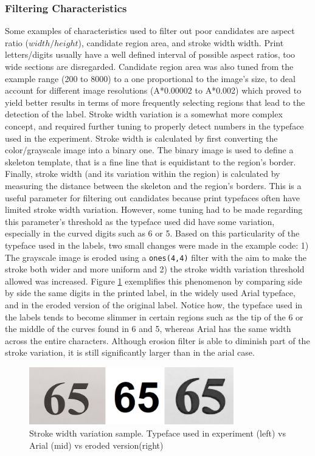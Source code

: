 \documentclass[11pt]{article}
\begin{document}
    \subsubsection{Filtering Characteristics}
        Some examples of characteristics used to filter out poor candidates are aspect ratio ($width / height$), candidate region area, and stroke width width. Print letters/digits usually have a well defined interval of possible aspect ratios, too wide sections are disregarded. Candidate region area was also tuned from the example range (200 to 8000) to a one proportional to the image's size, to deal account for different image resolutions (A*0.00002 to A*0.002) which proved to yield better results in terms of more frequently selecting regions that lead to the detection of the label. Stroke width variation is a somewhat more complex concept, and required further tuning to properly detect numbers in the typeface used in the experiment. Stroke width is calculated by first converting the color/grayscale image into a binary one. The binary image is used to define a skeleton template, that is a fine line that is equidistant to the region's border. Finally, stroke width (and its variation within the region) is calculated by measuring the distance between the skeleton and the region's borders. This is a useful parameter for filtering out candidates because print typefaces often have limited stroke width variation. However, some tuning had to be made regarding this parameter's threshold as the typeface used did have some variation, especially in the curved digits such as 6 or 5. Based on this particularity of the typeface used in the labels, two small changes were made in the example code: 1) The grayscale image is eroded using a \texttt{ones(4,4)} filter with the aim to make the stroke both wider and more uniform and 2) the stroke width variation threshold allowed was increased. Figure \ref{fig:ocr:stroke} exemplifies this phenomenon by comparing side by side the same digits in the printed label, in the widely used Arial typeface, and in the eroded version of the original label. Notice how, the typeface used in the labels tends to become slimmer in certain regions such as the tip of the 6 or the middle of the curves found in 6 and 5, whereas Arial has the same width across the entire characters. Although erosion filter is able to diminish part of the stroke variation, it is still significantly larger than in the arial case.
        \begin{figure}[h]
            \centering
            \includegraphics[height=2.5cm]{./Images/ocr/stroke.png}
            \caption{Stroke width variation sample. Typeface used in experiment (left) vs Arial (mid) vs eroded version(right)}
            \label{fig:ocr:stroke}
        \end{figure}
\end{document}
